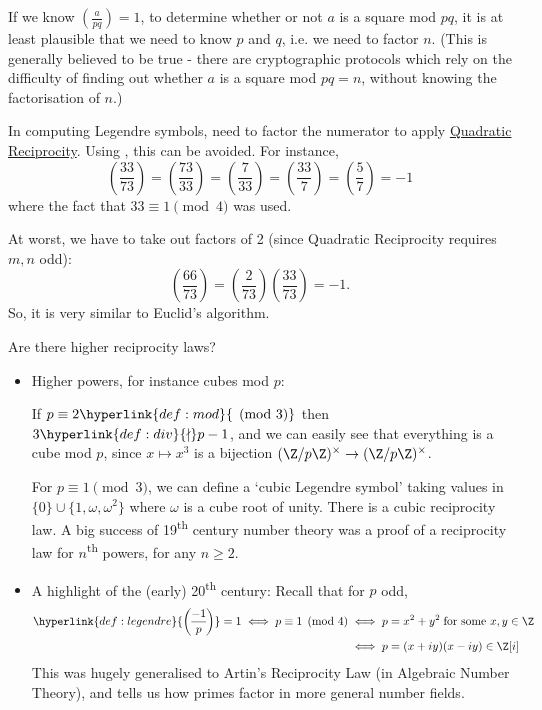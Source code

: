 \documentclass{article}
\newcommand{\legendre}[2]{\genfrac{(}{)}{}{}{#1}{#2}}
\begin{document}
If we know $\legendre{a}{pq} = 1$, to determine whether or not $a$ is a square mod $pq$, it is at least plausible that we need to know $p$ and $q$, i.e. we need to factor $n$.
(This is generally believed to be true - there are cryptographic protocols which rely on the difficulty of finding out whether $a$ is a square mod $pq=n$, without knowing the factorisation of $n$.)

In computing Legendre symbols, need to factor the numerator to apply \hyperlink{thm:qr}{Quadratic Reciprocity}.
Using , this can be avoided. For instance,
\begin{equation*}
    \legendre{33}{73} = \legendre{73}{33} = \legendre{7}{33} = \legendre{33}{7} = \legendre{5}{7} = -1
\end{equation*}
where the fact that $33 \equiv 1 \pmod{4}$ was used.

At worst, we have to take out factors of 2 (since Quadratic Reciprocity requires $m, n$ odd):
\begin{equation*}
    \legendre{66}{73} = \legendre{2}{73} \legendre{33}{73} = -1.
\end{equation*}
So, it is very similar to Euclid's algorithm.

Are there higher reciprocity laws?
\begin{itemize}
    \item Higher powers, for instance cubes mod $p$:

        If $p \equiv 2 \hyperlink{def:mod}{\pmod{3}}$ then $3 \hyperlink{def:div}{\nmid} p-1$, and we can easily see that everything is a cube mod $p$, since $x \mapsto x^3$ is a bijection $(\Z/p\Z)^\times \to (\Z/p\Z)^\times$.

        For $p \equiv 1 \pmod{3}$, we can define a `cubic Legendre symbol' taking values in $\{0\} \cup \{1, \omega, \omega^2\}$ where $\omega$ is a cube root of unity.
        There is a cubic reciprocity law.
        A big success of 19\textsuperscript{th} century number theory was a proof of a reciprocity law for $n$\textsuperscript{th} powers, for any $n \geq 2$.
    \item A highlight of the (early) 20\textsuperscript{th} century:
        Recall that for $p$ odd,
        \begin{align*}
            \hyperlink{def:legendre}{\legendre{-1}{p}} = 1 \iff p \equiv 1 \pmod{4} &\iff p = x^2 + y^2 \; \text{for some } x, y \in \Z \\
            &\iff p = (x+iy)(x-iy) \in \Z[i]
        \end{align*}
        This was hugely generalised to Artin's Reciprocity Law (in Algebraic Number Theory), and tells us how primes factor in more general number fields.
\end{itemize}
\end{document}
